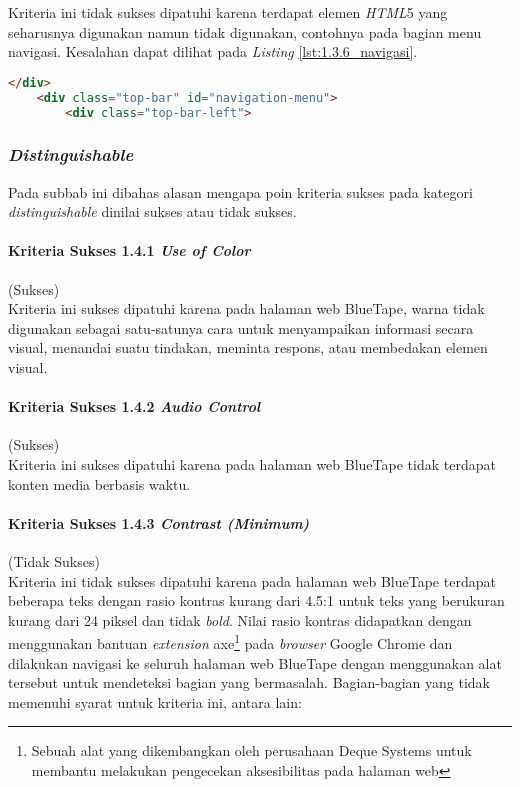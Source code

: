 Kriteria ini tidak sukses dipatuhi karena terdapat elemen \textit{HTML}5 yang seharusnya digunakan namun tidak digunakan, contohnya pada bagian menu navigasi. Kesalahan dapat dilihat pada \textit{Listing} \ref{lst:1.3.6_navigasi}.

\begin{lstlisting}[frame=single, label={lst:1.3.6_navigasi}, language=HTML, caption=Pelanggaran Kriteria Sukses 1.3.6 pada Menu Navigasi]
    </div>
    <div class="top-bar" id="navigation-menu">
        <div class="top-bar-left">
\end{lstlisting}

\subsubsection{\textit{Distinguishable}}
\label{subsubsec:kepatuhan_bluetape_distinguishable}
Pada subbab ini dibahas alasan mengapa poin kriteria sukses pada kategori \textit{distinguishable} dinilai sukses atau tidak sukses.

\paragraph{Kriteria Sukses 1.4.1 \textit{Use of Color}}
\label{par:kepatuhan_bluetape_kriteria_sukses_1.4.1}
(Sukses)\\

Kriteria ini sukses dipatuhi karena pada halaman web BlueTape, warna tidak digunakan sebagai satu-satunya cara untuk menyampaikan informasi secara visual, menandai suatu tindakan, meminta respons, atau membedakan elemen visual.

\paragraph{Kriteria Sukses 1.4.2 \textit{Audio Control}}
\label{par:kepatuhan_bluetape_kriteria_sukses_1.4.2}
(Sukses)\\

Kriteria ini sukses dipatuhi karena pada halaman web BlueTape tidak terdapat konten media berbasis waktu.

\paragraph{Kriteria Sukses 1.4.3 \textit{Contrast (Minimum)}}
\label{par:kepatuhan_bluetape_kriteria_sukses_1.4.3}
(Tidak Sukses)\\

Kriteria ini tidak sukses dipatuhi karena pada halaman web BlueTape terdapat beberapa teks dengan rasio kontras kurang dari 4.5:1 untuk teks yang berukuran kurang dari 24 piksel dan tidak \textit{bold}. Nilai rasio kontras didapatkan dengan menggunakan bantuan \textit{extension} axe\footnote{Sebuah alat yang dikembangkan oleh perusahaan Deque Systems untuk membantu melakukan pengecekan aksesibilitas pada halaman web} pada \textit{browser} Google Chrome dan dilakukan navigasi ke seluruh halaman web BlueTape dengan menggunakan alat tersebut untuk mendeteksi bagian yang bermasalah. Bagian-bagian yang tidak memenuhi syarat untuk kriteria ini, antara lain:

